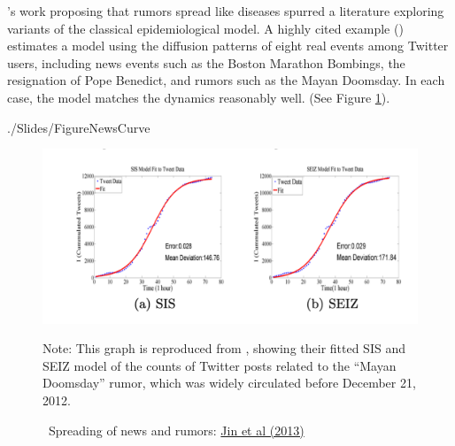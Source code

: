 \cite{daley1964epidemics}'s work proposing that rumors spread like diseases spurred a literature exploring variants of the classical epidemiological model.  A highly cited example (\cite{jin2013epidemiological}) %
estimates a model using the diffusion patterns of eight real events among Twitter users, including news events such as the Boston Marathon Bombings, the resignation of Pope Benedict, and rumors such as the Mayan Doomsday.  In each case, the model matches the dynamics reasonably well. (See Figure \ref{fig:news_curve}).


\begin{verbatimwrite}{./Slides/FigureNewsCurve}
	\begin{figure}[!ht] \centering  %
		\caption{ ~Spreading of news and rumors: \href{https://people.cs.vt.edu/ramakris/papers/news-rumor-epi-snakdd13.pdf}{Jin et al (2013)}}\nocite{jin2013epidemiological}
		\label{fig:news_curve}
		\centerline{\includegraphics[width=\textwidth]{./figures/Doomsday}}
		\begin{flushleft}{\footnotesize Note: This graph is reproduced from \cite{jin2013epidemiological}, showing their fitted SIS and SEIZ model of the counts of Twitter posts related to the ``Mayan Doomsday'' rumor, which was widely circulated before December 21, 2012.}
		\end{flushleft}
	\end{figure}
\end{verbatimwrite}%

